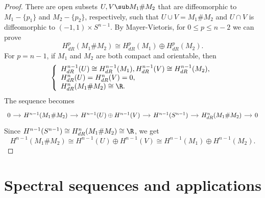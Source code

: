 \begin{proof}
There are open subsets $U,V\sub M_1\#M_2$ that are diffeomorphic to $M_1-\{p_1\}$ and $M_2-\{p_2\}$, respectively, such that $U\cup V=M_1\#M_2$ and $U\cap V$ is diffeomorphic to $(-1,1)\times S^{n-1}$. By Mayer-Vietoris, for $0\leq p\leq n-2$ we can prove
\[H^p_{dR}(M_1\#M_2)\cong H^p_{dR}(M_1)\oplus H^p_{dR}(M_2).\]
For $p=n-1$, if $M_1$ and $M_2$ are both compact and orientable, then 
\[\left\{\begin{array}{l}
H^{n-1}_{dR}(U)\cong H^{n-1}_{dR}(M_1),H^{n-1}_{dR}(V)\cong H^{n-1}_{dR}(M_2),\\
H^n_{dR}(U)=H^n_{dR}(V)=0,\\
H^n_{dR}(M_1\#M_2)\cong\R.
\end{array}\right. \]
The sequence becomes
\[\begin{tikzcd}[column sep=small]
0\ar[r]&H^{n-1}(M_1\#M_2)\ar[r]&H^{n-1}(U)\oplus H^{n-1}(V)\ar[r]&H^{n-1}(S^{n-1})\ar[r]&H^n_{dR}(M_1\#M_2)\ar[r]&0
\end{tikzcd}\]
Since $H^{n-1}(S^{n-1})\cong H^n_{dR}(M_1\#M_2)\cong\R$, we get 
\[H^{n-1}(M_1\#M_2)\cong H^{n-1}(U)\oplus H^{n-1}(V)\cong H^{n-1}(M_1)\oplus H^{n-1}(M_2).\]
\end{proof}
\newpage
\section{Spectral sequences and applications}
